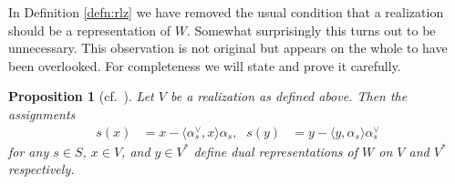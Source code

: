 \documentclass{amsart}
\theoremstyle{plain}
\newtheorem{prop}[thm]{Proposition}
\theoremstyle{definition}
\theoremstyle{remark}
\numberwithin{equation}{section}
\begin{document}
In Definition \ref{defn:rlz} we have removed the usual condition that a realization should be a representation of $W$. 
Somewhat surprisingly this turns out to be unnecessary. 
This observation is not original but appears on the whole to have been overlooked.
For completeness we will state and prove it carefully.

\begin{prop}[{cf.~\cite[\S A.2]{dihedralcathedral}}] \label{prop:rlz=cartanmat}
Let $V$ be a realization as defined above. 
Then the assignments
\begin{align*}
s(x)& =x-\langle \alpha_s^\vee, x\rangle \alpha_s \text{,} & s(y)& =y-\langle y,\alpha_s \rangle \alpha_s^\vee
\end{align*}
for any $s \in S$, $x \in V$, and $y \in V^\ast$ define dual representations of $W$ on $V$ and $V^\ast$ respectively.
\end{prop}
\end{document}
